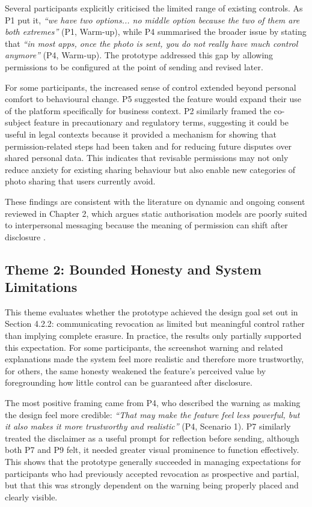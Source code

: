 Several participants explicitly criticised the limited range of existing controls. As P1 put it, \textit{``we have two options... no middle option because the two of them are both extremes''} (P1, Warm-up), while P4 summarised the broader issue by stating that \textit{``in most apps, once the photo is sent, you do not really have much control anymore''} (P4, Warm-up). The prototype addressed this gap by allowing permissions to be configured at the point of sending and revised later.

For some participants, the increased sense of control extended beyond personal comfort to behavioural change. P5 suggested the feature would expand their use of the platform specifically for business context. P2 similarly framed the co-subject feature in precautionary and regulatory terms, suggesting it could be useful in legal contexts because it provided a mechanism for showing that permission-related steps had been taken and for reducing future disputes over shared personal data. This indicates that revisable permissions may not only reduce anxiety for existing sharing behaviour but also enable new categories of photo sharing that users currently avoid.
 
These findings are consistent with the literature on dynamic and ongoing consent reviewed in Chapter 2, which argues static authorisation models are poorly suited to interpersonal messaging because the meaning of permission can shift after disclosure \cite{im_yes_2021, kaye_dynamic_2015, wilbanks_design_2018}.    

\subsection{Theme 2: Bounded Honesty and System Limitations}
This theme evaluates whether the prototype achieved the design goal set out in Section 4.2.2: communicating revocation as limited but meaningful control rather than implying complete erasure. In practice, the results only partially supported this expectation. For some participants, the screenshot warning and related explanations made the system feel more realistic and therefore more trustworthy, for others, the same honesty weakened the feature’s perceived value by foregrounding how little control can be guaranteed after disclosure.


The most positive framing came from P4, who described the warning as making the design feel more credible: \textit{``That may make the feature feel less powerful, but it also makes it more trustworthy and realistic''} (P4, Scenario 1). P7 similarly treated the disclaimer as a useful prompt for reflection before sending, although both P7 and P9 felt, it needed greater visual prominence to function effectively. This shows that the prototype generally succeeded in managing expectations for participants who had previously accepted revocation as prospective and partial, but that this was strongly dependent on the warning being properly placed and clearly visible.
 
